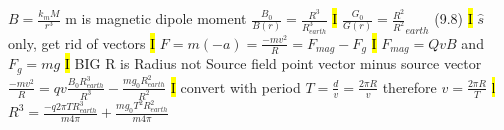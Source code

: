 \documentclass[fontsize=4pt]{scrartcl}
\begin{document}
$B = \frac{k_m M}{r^3}$ m is magnetic dipole moment
$\frac{B_0}{B(r)} = \frac{R^3}{R^3_{earth}}$
\hl{I}
$\frac{G_0}{G(r)} = \frac{R^2}{R^2}_{earth}$ (9.8)
\hl{I}
$\hat{s}$ only, get rid of vectors
\hl{I}
$F = m(-a) = \frac{-mv^2}{R} = F_{mag} - F_{g}$
\hl{I}
$F_{mag} = QvB$ and $F_g = mg$
\hl{I}
BIG R is Radius not Source field point vector minus source vector
$\frac{-mv^2}{R} = qv \frac{B_0 R^3_{earth}}{R^3} - \frac{m g_0 R^2_{earth}}{R^2}$
\hl{I}
convert with period $T = \frac{d}{v} = \frac{2\pi R}{v} $ therefore $v = \frac{2\pi R}{T}$
\hl{l}
$R^3 = \frac{-q2\pi T R^3_{earth}}{m4\pi} + \frac{mg_0 T^2 R^2_{earth}}{m4\pi}$
\end{document}
